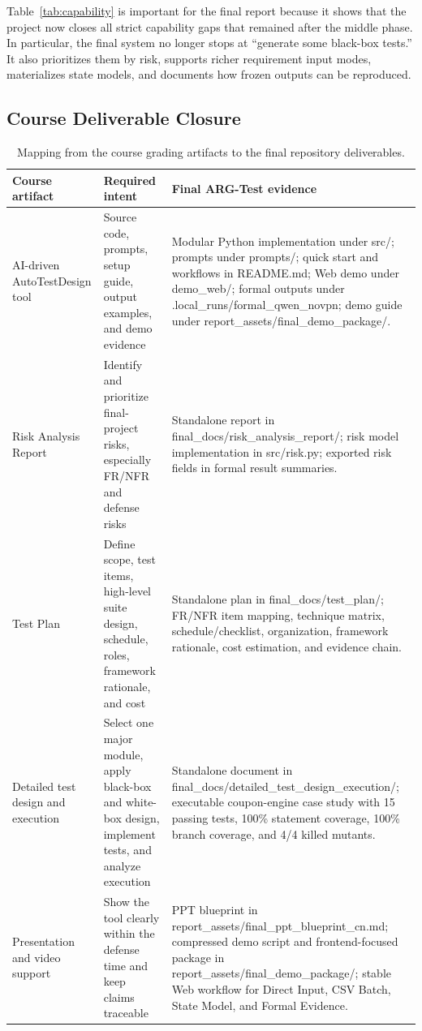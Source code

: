 \documentclass{article}
\renewcommand{\texttt}[1]{{\normalfont #1}}
\begin{document}
Table~\ref{tab:capability} is important for the final report because it shows that the project now closes all strict capability gaps that remained after the middle phase. In particular, the final system no longer stops at ``generate some black-box tests.'' It also prioritizes them by risk, supports richer requirement input modes, materializes state models, and documents how frozen outputs can be reproduced.

\subsection{Course Deliverable Closure}
\begin{table}[t]
\centering
\scriptsize
\setlength{\tabcolsep}{3pt}
\caption{Mapping from the course grading artifacts to the final repository deliverables.}
\label{tab:deliverables}
\begin{tabular}{p{} p{} p{}}
\toprule
\textbf{Course artifact} & \textbf{Required intent} & \textbf{Final ARG-Test evidence} \\
\midrule
AI-driven AutoTestDesign tool & Source code, prompts, setup guide, output examples, and demo evidence & Modular Python implementation under \texttt{src/}; prompts under \texttt{prompts/}; quick start and workflows in \texttt{README.md}; Web demo under \texttt{demo\_web/}; formal outputs under \texttt{.local\_runs/formal\_qwen\_novpn}; demo guide under \texttt{report\_assets/final\_demo\_package/}. \\
Risk Analysis Report & Identify and prioritize final-project risks, especially FR/NFR and defense risks & Standalone report in \texttt{final\_docs/risk\_analysis\_report/}; risk model implementation in \texttt{src/risk.py}; exported risk fields in formal result summaries. \\
Test Plan & Define scope, test items, high-level suite design, schedule, roles, framework rationale, and cost & Standalone plan in \texttt{final\_docs/test\_plan/}; FR/NFR item mapping, technique matrix, schedule/checklist, organization, framework rationale, cost estimation, and evidence chain. \\
Detailed test design and execution & Select one major module, apply black-box and white-box design, implement tests, and analyze execution & Standalone document in \texttt{final\_docs/detailed\_test\_design\_execution/}; executable coupon-engine case study with 15 passing tests, 100\% statement coverage, 100\% branch coverage, and 4/4 killed mutants. \\
Presentation and video support & Show the tool clearly within the defense time and keep claims traceable & PPT blueprint in \texttt{report\_assets/final\_ppt\_blueprint\_cn.md}; compressed demo script and frontend-focused package in \texttt{report\_assets/final\_demo\_package/}; stable Web workflow for Direct Input, CSV Batch, State Model, and Formal Evidence. \\
\bottomrule
\end{tabular}
\end{table}
\end{document}
